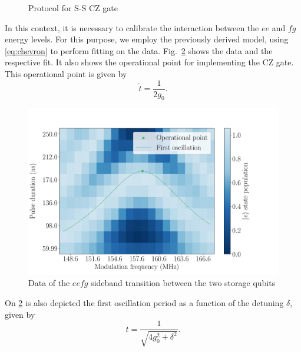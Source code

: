 \begin{figure}
    \centering
    
    \vspace{-1cm}
    \caption{Protocol for S-S CZ gate}
    \label{fig:SS_CZ}
\end{figure}

In this context, it is necessary to calibrate the interaction between the $ee$ and $fg$ energy levels.
For this purpose, we employ the previously derived model, using \cref{eq:chevron} to perform fitting on the data.
Fig.~\ref{fig:Chev_data} shows the data and the respective fit.
It also shows the operational point for implementing the CZ gate.
This operational point is given by
\begin{equation}
    \widetilde{t} = \frac{1}{2 g_0}.
\end{equation}

\begin{figure}
    \centering
    \includegraphics[width=0.8\linewidth]{Images//Chap3/Chevron_data.pdf}
    \caption{Data of the $eefg$ sideband transition between the two storage qubits}
    \label{fig:Chev_data}
\end{figure}

On \cref{fig:Chev_data} is also depicted the first oscillation period as a function of the detuning $\delta$, given by
\begin{equation}
    t = \frac{1}{\sqrt{4 g_0^2 + \delta^2}} . 
\end{equation}
